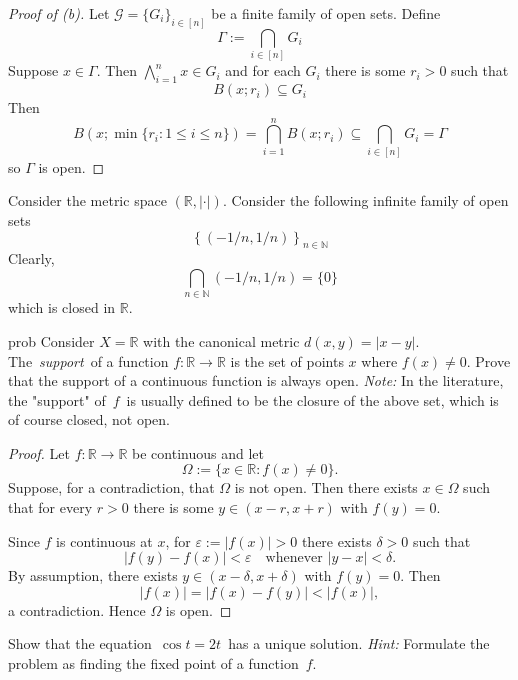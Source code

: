 \begin{proof}[Proof of (b)]
    Let $\mathcal G = \{G_i\}_{i \in [n]}$ be a finite family of 
    open sets.  
    Define 
    \[
        \Gamma := \bigcap_{i\in[n]} G_i
    \]
    Suppose $x \in \Gamma$. Then $\bigwedge_{i=1}^n x \in G_i$ and 
    for each $G_i$ there is some $r_i > 0$ such that 
    \[
        B(x;r_i) \subseteq G_i
    \]
    Then 
    \[
        B(x;\min\{r_i : 1 \leq i \leq n\}) = 
        \bigcap_{i=1}^n B(x;r_i) \subseteq \bigcap_{i \in [n]} G_i 
        = \Gamma
    \]
    so $\Gamma$ is open.
\end{proof}
\begin{ex}
    Consider the metric space $(\mathbb R, |\cdot|)$. 
    Consider the following infinite family of open sets 
    \[
        \left\{ 
            (-1/n,1/n)
        \right\}_{n \in \mathbb N}
    \]      
    Clearly, 
    \[
        \bigcap_{n\in\mathbb N} (-1/n,1/n) = \{0\}
    \]
    which is closed in $\mathbb R$.
\end{ex}
\begin{prob}
    prob
    Consider $X=\mathbb{R}$ with the canonical metric $d(x,y)=|x-y|$. The \emph{support} of a function $f:\mathbb{R}\to\mathbb{R}$ is the set of points $x$ where $f(x)\neq 0$. Prove that the support of a continuous function is always open.  
    \emph{Note:} In the literature, the "support" of $f$ is usually defined to be the closure of the above set, which is of course closed, not open.
\end{prob}
\begin{proof}
    Let $f:\mathbb R\to\mathbb R$ be continuous and let
    \[
        \Omega := \{x\in\mathbb R : f(x)\neq 0\}.
    \]
    Suppose, for a contradiction, that $\Omega$ is not open. 
    Then there exists
    $x\in\Omega$ such that for every $r>0$ there is some 
    $y\in(x-r,x+r)$ with
    $f(y)=0$.

    Since $f$ is continuous at $x$, for $\varepsilon := |f(x)| > 0$ 
    there exists
    $\delta>0$ such that
    \[
        |f(y)-f(x)|<\varepsilon \quad \text{whenever } |y-x|<\delta.
    \]
    By assumption, there exists $y\in(x-\delta,x+\delta)$ 
    with $f(y)=0$.
    Then
    \[
        |f(x)| = |f(x)-f(y)| < |f(x)|,
    \]
    a contradiction. Hence $\Omega$ is open.
\end{proof}
\begin{prob}
    Show that the equation $\cos t = 2t$ has a unique solution.  
    \emph{Hint:} Formulate the problem as finding the fixed point of a function $f$.
\end{prob}
